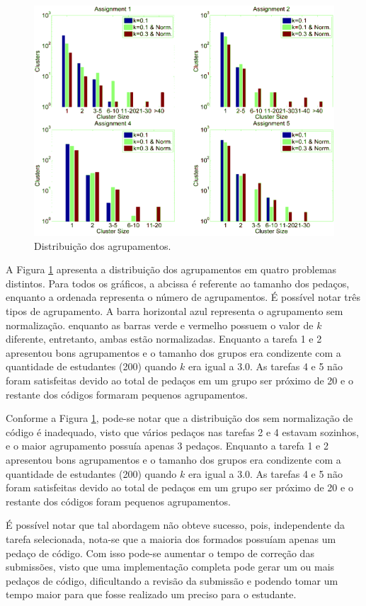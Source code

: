 		\begin{figure}
			\centering
			\includegraphics[width=0.7\linewidth]{imagem/clusteringPerformance}
			\captionsetup{justification=centering}
			\caption{Distribuição dos agrupamentos.}
			\label{fig:clusteringPerformance}
		\end{figure}
	    
		A Figura \ref{fig:clusteringPerformance} apresenta a distribuição dos
		agrupamentos em quatro problemas distintos. Para todos os gráficos, a
		abcissa é referente ao tamanho dos pedaços, enquanto a ordenada representa
		o número de agrupamentos. É possível notar três tipos de agrupamento. A barra
		horizontal azul representa o agrupamento sem normalização. enquanto as barras
		verde e vermelho possuem o valor de $k$ diferente, entretanto, ambas estão
		normalizadas. Enquanto a tarefa 1 e 2 apresentou bons agrupamentos e o tamanho
		dos grupos era condizente com a quantidade de estudantes (200) quando $k$ era
		igual a 3.0. As tarefas 4 e 5 não foram satisfeitas devido ao total de pedaços
		em um grupo ser próximo de 20 e o restante dos códigos formaram pequenos
		agrupamentos.
		
		Conforme a Figura \ref{fig:clusteringPerformance}, pode-se notar que a
		distribuição dos  sem normalização de código é inadequado,
		visto que vários pedaços nas tarefas 2 e 4 estavam sozinhos, e o maior
		agrupamento possuía apenas 3 pedaços. Enquanto a tarefa 1 e 2 apresentou
		bons agrupamentos e o tamanho dos grupos era condizente com a quantidade de
		estudantes (200) quando $k$ era igual a 3.0. As tarefas 4 e 5 não foram
		satisfeitas devido ao total de pedaços em um grupo ser próximo de 20 e o
		restante dos códigos foram pequenos agrupamentos.
		
		É possível notar que tal abordagem não obteve sucesso, pois, independente da
		tarefa selecionada, nota-se que a maioria dos  formados
		possuíam apenas um pedaço de código. Com isso pode-se aumentar o tempo de
		correção das submissões, visto que uma implementação completa pode gerar um
		ou mais pedaços de código, dificultando a revisão da submissão e podendo tomar
		um tempo maior para que fosse realizado um  preciso para o
		estudante.
		
